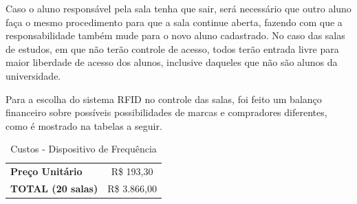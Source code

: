 Caso o aluno responsável pela sala tenha que sair, será necessário que outro aluno faça o mesmo procedimento para que a sala continue aberta, fazendo com que a responsabilidade também mude para o novo aluno cadastrado. No caso das salas de estudos, em que não terão controle de acesso, todos terão entrada livre para maior liberdade de acesso dos alunos, inclusive daqueles que não são alunos da universidade.

Para a escolha do sistema RFID no controle das salas, foi feito um balanço financeiro sobre possíveis possibilidades de marcas e compradores diferentes, como é mostrado na tabelas a seguir.

\begin{table}[h]
  \centering
  \caption{Custos - Dispositivo de Frequência}
  \begin{tabular}{l|l|}
    \cline{2-2}
    \textbf{Preço Unitário}   & \multicolumn{1}{c|}{R\$ 193,30} \\ \cline{2-2}
    \textbf{TOTAL (20 salas)} & R\$ 3.866,00                    \\ \cline{2-2}
  \end{tabular}
\end{table}

